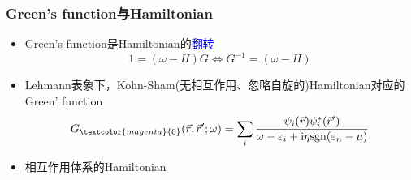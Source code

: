 \frame
{
	\frametitle{\textrm{Green's function}与\textrm{Hamiltonian}}
	\begin{itemize}
		\item \textrm{Green's function}是\textrm{Hamiltonian}的\textcolor{blue}{翻转}
			\begin{displaymath}
				1=(\omega-H)G\Longleftrightarrow G^{-1}=(\omega -H)
			\end{displaymath}
		\item \textrm{Lehmann}表象下，\textrm{Kohn-Sham}(无相互作用、忽略自旋的)\textrm{Hamiltonian}对应的\textrm{Green' function}
			\begin{displaymath}
				G_{\textcolor{magenta}{0}}(\vec r,\vec r^{\prime};\omega)=\sum_i\dfrac{\psi_i(\vec r)\psi_i^{\ast}(\vec r^{\prime})}{\omega-\varepsilon_i+\mathrm{i}\eta\mathrm{sgn}(\varepsilon_n-\mu)}
			\end{displaymath}
			{\fontsize{6.2pt}{6.2pt}}
		\item 相互作用体系的\textrm{Hamiltonian}%
		\fontsize{9.5pt}{4.2pt}
	\end{itemize}
}

